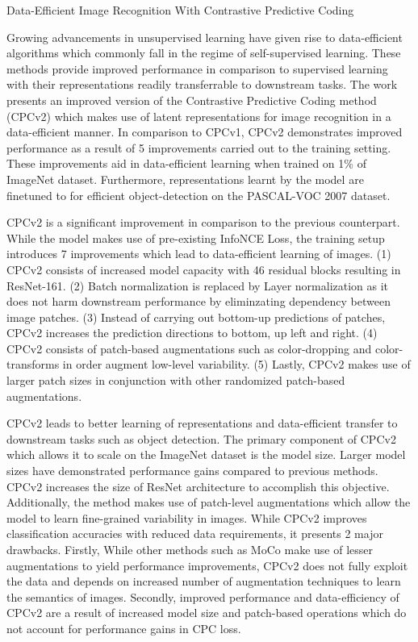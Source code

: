 \documentclass[11pt,letterpaper]{article}
\begin{document}
\begin{center}
  \large{Data-Efficient Image Recognition With Contrastive Predictive Coding}
\end{center}


Growing advancements in unsupervised learning have given rise to data-efficient algorithms which commonly fall in the regime of self-supervised learning. These methods provide improved performance in comparison to supervised learning with their representations readily transferrable to downstream tasks. The work presents an improved version of the Contrastive Predictive Coding method (CPCv2) which makes use of latent representations for image recognition in a data-efficient manner. In comparison to CPCv1, CPCv2 demonstrates improved performance as a result of 5 improvements carried out to the training setting. These improvements aid in data-efficient learning when trained on 1\% of ImageNet dataset. Furthermore, representations learnt by the model are finetuned to for efficient object-detection on the PASCAL-VOC 2007 dataset.

CPCv2 is a significant improvement in comparison to the previous counterpart. While the model makes use of pre-existing InfoNCE Loss, the training setup introduces 7 improvements which lead to data-efficient learning of images. (1) CPCv2 consists of increased model capacity with 46 residual blocks resulting in ResNet-161. (2) Batch normalization is replaced by Layer normalization as it does not harm downstream performance by eliminzating dependency between image patches. (3) Instead of carrying out bottom-up predictions of patches, CPCv2 increases the prediction directions to bottom, up left and right. (4) CPCv2 consists of patch-based augmentations such as color-dropping and color-transforms in order augment low-level variability. (5) Lastly, CPCv2 makes use of larger patch sizes in conjunction with other randomized patch-based augmentations.

CPCv2 leads to better learning of representations and data-efficient transfer to downstream tasks such as object detection. The primary component of CPCv2 which allows it to scale on the ImageNet dataset is the model size. Larger model sizes have demonstrated performance gains compared to previous methods. CPCv2 increases the size of ResNet architecture to accomplish this objective. Additionally, the method makes use of patch-level augmentations which allow the model to learn fine-grained variability in images. While CPCv2 improves classification accuracies with reduced data requirements, it presents 2 major drawbacks. Firstly, While other methods such as MoCo make use of lesser augmentations to yield performance improvements, CPCv2 does not fully exploit the data and depends on increased number of augmentation techniques to learn the semantics of images. Secondly, improved performance and data-efficiency of CPCv2 are a result of increased model size and patch-based operations which do not account for performance gains in CPC loss.
\end{document}
